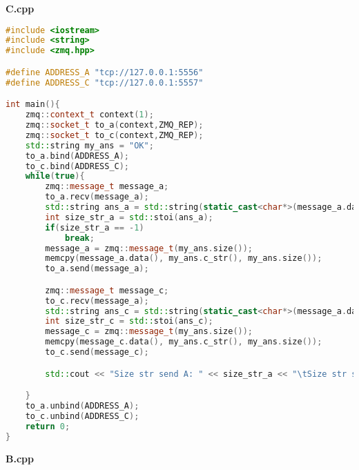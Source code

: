 \documentclass[pdf, unicode, 12pt, a4paper,oneside,fleqn]{article}
\begin{document}
{\large\textbf{C.cpp}}

\begin{lstlisting}[language=C++]
#include <iostream>
#include <string>
#include <zmq.hpp>

#define ADDRESS_A "tcp://127.0.0.1:5556"
#define ADDRESS_C "tcp://127.0.0.1:5557"

int main(){
    zmq::context_t context(1);
    zmq::socket_t to_a(context,ZMQ_REP);
    zmq::socket_t to_c(context,ZMQ_REP);
    std::string my_ans = "OK";
    to_a.bind(ADDRESS_A);
    to_c.bind(ADDRESS_C);
    while(true){
        zmq::message_t message_a;
        to_a.recv(message_a);
        std::string ans_a = std::string(static_cast<char*>(message_a.data()), message_a.size());
        int size_str_a = std::stoi(ans_a);
        if(size_str_a == -1)
            break;
        message_a = zmq::message_t(my_ans.size());
        memcpy(message_a.data(), my_ans.c_str(), my_ans.size());
        to_a.send(message_a);

        zmq::message_t message_c;
        to_c.recv(message_a);
        std::string ans_c = std::string(static_cast<char*>(message_a.data()), message_a.size());
        int size_str_c = std::stoi(ans_c);
        message_c = zmq::message_t(my_ans.size());
        memcpy(message_c.data(), my_ans.c_str(), my_ans.size());
        to_c.send(message_c);

        std::cout << "Size str send A: " << size_str_a << "\tSize str send C: " << size_str_c << std::endl;

    }
    to_a.unbind(ADDRESS_A);
    to_c.unbind(ADDRESS_C);
    return 0;
}
\end{lstlisting}

{\large\textbf{B.cpp}}
\end{document}
